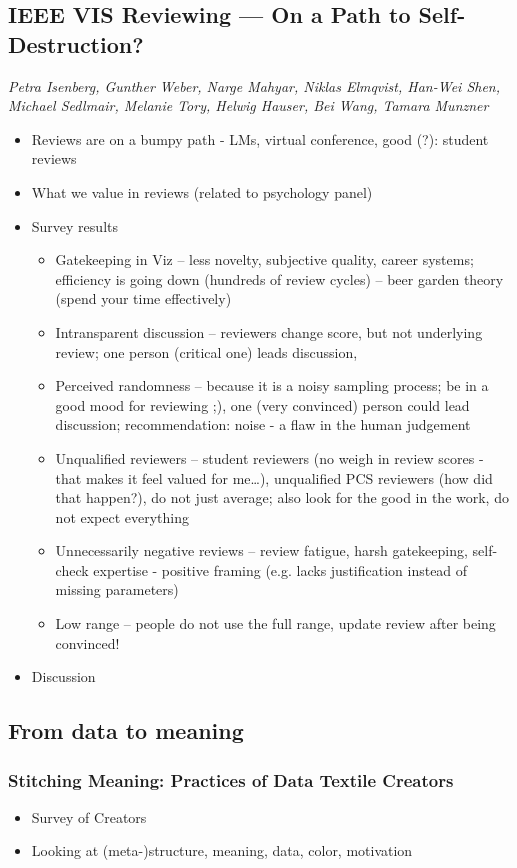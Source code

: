 \documentclass[a4paper]{article}
\begin{document}
\subsection{IEEE VIS Reviewing — On a Path to Self-Destruction?}
\textit{Petra Isenberg, Gunther Weber, Narge Mahyar, Niklas Elmqvist, Han-Wei Shen, Michael Sedlmair, Melanie Tory, Helwig Hauser, Bei Wang, Tamara Munzner}
\begin{itemize}
    \item Reviews are on a bumpy path - LMs, virtual conference, good (?): student reviews
    \item What we  value in reviews (related to psychology panel)
    \item Survey results
    \begin{itemize}
        \item Gatekeeping in Viz -- less novelty, subjective quality, career systems; efficiency is going down (hundreds of review cycles) -- beer garden theory (spend your time effectively)
        \item Intransparent discussion -- reviewers change score, but not underlying review; one person (critical one) leads discussion, 
        \item Perceived randomness -- because it is a noisy sampling process; be in a good mood for reviewing ;), one (very convinced) person could lead discussion; recommendation: noise - a flaw in the human judgement
        \item Unqualified reviewers -- student reviewers (no weigh in review scores - that makes it feel valued for me\dots), unqualified PCS reviewers (how did that happen?), do not just average; also look for the good in the work, do not expect everything
        \item Unnecessarily negative reviews -- review fatigue, harsh gatekeeping, self-check expertise - positive framing (e.g. lacks justification instead of missing parameters)
        \item Low range -- people do not use the full range, update review after being convinced!
    \end{itemize}
    \item Discussion
\end{itemize}
\subsection{From data to meaning}
\subsubsection{Stitching Meaning: Practices of Data Textile Creators}
\begin{itemize}
    \item Survey of Creators
    \item Looking at (meta-)structure, meaning, data, color, motivation
\end{itemize}
\end{document}
